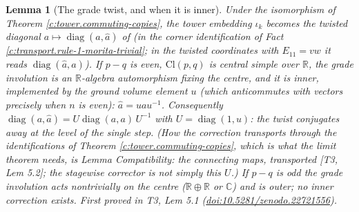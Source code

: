 \documentclass[11pt]{article}
\newtheorem{lemma}[theorem]{Lemma}
\theoremstyle{definition}
\theoremstyle{plain}
\providecommand{\C}{}\renewcommand{\C}{\mathbb{C}}
\providecommand{\Cl}{}\renewcommand{\Cl}{\mathrm{Cl}}
\providecommand{\R}{}\renewcommand{\R}{\mathbb{R}}
\begin{document}
\begin{lemma}[The grade twist, and when it is inner]\label{c:tower.grade-twist-when-it-inner}
Under the isomorphism of Theorem \ref{c:tower.commuting-copies}, the tower embedding $\iota_k$ becomes the twisted diagonal $a \mapsto \operatorname{diag}(a, \hat a)$ of \cite[Thm.~7.1]{ButlerT1} (in the corner identification of Fact \ref{c:transport.rule-1-morita-trivial}; in the twisted coordinates with $E_{11} = vw$ it reads $\operatorname{diag}(\hat a, a)$). If $p - q$ is even, $\Cl(p,q)$ is central simple over $\R$, the grade involution is an $\R$-algebra automorphism fixing the centre, and it is inner, implemented by the ground volume element $u$ (which anticommutes with vectors precisely when $n$ is even): $\hat a = u a u^{-1}$. Consequently $\operatorname{diag}(a, \hat a) = U \operatorname{diag}(a, a)\, U^{-1}$ with $U = \operatorname{diag}(1, u)$: the twist conjugates away at the level of the single step. (How the correction transports through the identifications of Theorem \ref{c:tower.commuting-copies}, which is what the limit theorem needs, is Lemma \emph{Compatibility: the connecting maps, transported} [T3, Lem 5.2]; the stagewise corrector is \emph{not} simply this $U$.) If $p - q$ is odd the grade involution acts nontrivially on the centre ($\R \oplus \R$ or $\C$) and is outer; no inner correction exists.
\emph{First proved in} T3, Lem 5.1 (\href{https://doi.org/10.5281/zenodo.22721556}{doi:10.5281/zenodo.22721556}).
\end{lemma}
\end{document}
